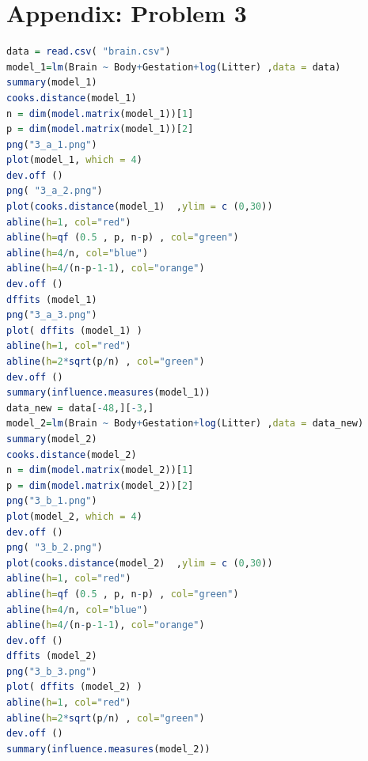 \documentclass[12pt,a4paper]{article}
\begin{document}
\section{Appendix: Problem 3}
\begin{lstlisting}[language = R]
data = read.csv( "brain.csv")
model_1=lm(Brain ~ Body+Gestation+log(Litter) ,data = data) 
summary(model_1) 
cooks.distance(model_1) 
n = dim(model.matrix(model_1))[1] 
p = dim(model.matrix(model_1))[2] 
png("3_a_1.png") 
plot(model_1, which = 4) 
dev.off () 
png( "3_a_2.png")
plot(cooks.distance(model_1)  ,ylim = c (0,30)) 
abline(h=1, col="red") 
abline(h=qf (0.5 , p, n-p) , col="green") 
abline(h=4/n, col="blue") 
abline(h=4/(n-p-1-1), col="orange") 
dev.off () 
dffits (model_1)
png("3_a_3.png")
plot( dffits (model_1) ) 
abline(h=1, col="red") 
abline(h=2*sqrt(p/n) , col="green") 
dev.off () 
summary(influence.measures(model_1)) 
data_new = data[-48,][-3,]
model_2=lm(Brain ~ Body+Gestation+log(Litter) ,data = data_new) 
summary(model_2) 
cooks.distance(model_2) 
n = dim(model.matrix(model_2))[1] 
p = dim(model.matrix(model_2))[2] 
png("3_b_1.png") 
plot(model_2, which = 4) 
dev.off () 
png( "3_b_2.png")
plot(cooks.distance(model_2)  ,ylim = c (0,30)) 
abline(h=1, col="red") 
abline(h=qf (0.5 , p, n-p) , col="green") 
abline(h=4/n, col="blue") 
abline(h=4/(n-p-1-1), col="orange") 
dev.off () 
dffits (model_2)
png("3_b_3.png")
plot( dffits (model_2) ) 
abline(h=1, col="red") 
abline(h=2*sqrt(p/n) , col="green") 
dev.off () 
summary(influence.measures(model_2)) 
\end{lstlisting}
\end{document}
